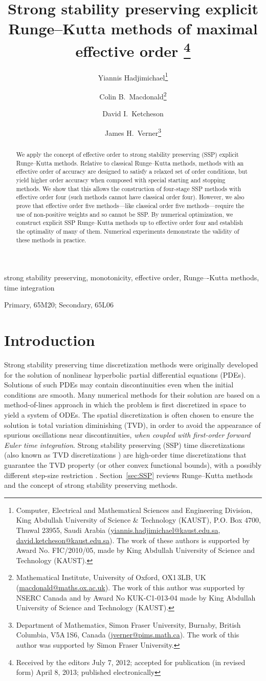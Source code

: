 \documentclass[final]{siamltex}  %
\title{Strong stability preserving explicit Runge--Kutta methods of maximal effective order
		\thanks{Received by the editors July 7, 2012; 
		accepted for publication (in revised form) April 8, 2013; 
		published electronically }
}%
\author{
        Yiannis Hadjimichael\thanks{Computer, Electrical and Mathematical Sciences and 
        Engineering Division, King Abdullah University of Science \& Technology (KAUST), 
        P.O. Box 4700, Thuwal 23955, Saudi Arabia
        (\url{yiannis.hadjimichael@kaust.edu.sa}, 
        \url{david.ketcheson@kaust.edu.sa}).
        The work of these authors is supported by Award No. FIC/2010/05, made by King 
        Abdullah University of Science and Technology (KAUST).}
        \and 
        Colin B.~Macdonald\thanks{Mathematical Institute, University of Oxford, OX1\,3LB, UK 
        (\url{macdonald@maths.ox.ac.uk}).
        The work of this author was supported by NSERC 
        Canada and by Award No KUK-C1-013-04 made by King Abdullah University of Science 
        and Technology (KAUST).}
        \and 
        David I.~Ketcheson\footnotemark[1]
        \and 
        James H.~Verner\thanks{Department of Mathematics, Simon Fraser University,
        Burnaby, British Columbia, V5A\,1S6, Canada
        (\url{jverner@pims.math.ca}).
        The work of this author was supported by Simon Fraser University.}
}%
\date{}
\begin{document}
\maketitle
        
\begin{abstract}
We apply the concept of effective order to strong stability preserving (SSP) explicit 
Runge--Kutta methods.
Relative to classical Runge--Kutta methods, methods with an effective order of accuracy are 
designed to satisfy a relaxed set of order conditions, but yield higher order accuracy  when 
composed with special starting and stopping methods. 
We show that this allows the construction of four-stage SSP methods with effective order four 
(such methods cannot have classical order four). 
However, we also prove that effective order five methods---like classical order five 
methods---require the use of non-positive weights and so cannot be SSP.
By numerical optimization, we construct explicit SSP Runge--Kutta methods up to effective order 
four and establish the optimality of many of them.
Numerical experiments demonstrate the validity of these methods in practice.
\end{abstract}

\begin{keywords} 
	strong stability preserving, monotonicity, effective order, Runge–-Kutta methods, 
	time integration
\end{keywords}

\begin{AMS}
	Primary, 65M20; Secondary, 65L06
\end{AMS}

\pagestyle{myheadings}
\thispagestyle{plain}


\section{Introduction}\label{sec:Intro}
Strong stability preserving time discretization methods were originally
developed for the solution of nonlinear hyperbolic 
partial differential equations (PDEs).  Solutions of such PDEs may 
contain discontinuities even when the initial conditions are smooth.
Many numerical methods for their solution are based on a method-of-lines approach 
in which the problem is first discretized in space to yield a system of ODEs. 
The spatial discretization is often chosen to ensure the solution is total variation diminishing (TVD),
in order to avoid the appearance of spurious oscillations near discontinuities,
\emph{when coupled with first-order forward Euler time integration}.
Strong stability preserving (SSP) time discretizations (also known as TVD
discretizations \cite{Gottlieb/Shu:1998}) are high-order time
discretizations that guarantee the TVD property (or other convex functional bounds), with a
possibly different step-size restriction \cite{Gottlieb2011a}.
Section~\ref{sec:SSP} reviews Runge--Kutta methods and the concept of
strong stability preserving methods.
\end{document}
